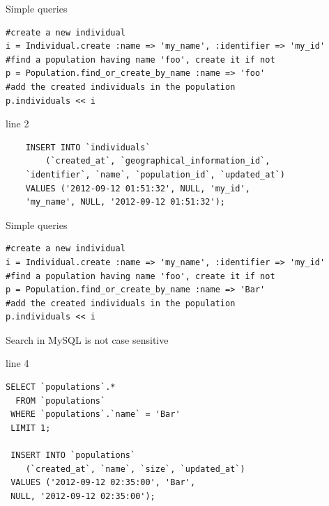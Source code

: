 \documentclass[12pt]{beamer}
\begin{document}

\begin{frame}[fragile]
  \begin{block}{Simple queries}
	\begin{verbatim}
#create a new individual
i = Individual.create :name => 'my_name', :identifier => 'my_id'
#find a population having name 'foo', create it if not
p = Population.find_or_create_by_name :name => 'foo'
#add the created individuals in the population
p.individuals << i
	\end{verbatim}
  \end{block}
  
  \begin{block}{line 2}
  	\begin{verbatim}
  	INSERT INTO `individuals` 
  		(`created_at`, `geographical_information_id`, 
  	`identifier`, `name`, `population_id`, `updated_at`) 
  	VALUES ('2012-09-12 01:51:32', NULL, 'my_id', 
  	'my_name', NULL, '2012-09-12 01:51:32');
  	\end{verbatim}
  \end{block}
\end{frame}

\begin{frame}[fragile]
  \begin{block}{Simple queries}
	\begin{verbatim}
#create a new individual
i = Individual.create :name => 'my_name', :identifier => 'my_id'
#find a population having name 'foo', create it if not
p = Population.find_or_create_by_name :name => 'Bar'
#add the created individuals in the population
p.individuals << i
	\end{verbatim}
	Search in MySQL is not case sensitive
  \end{block}
  
  \begin{block}{line 4}
  	\begin{verbatim}
SELECT `populations`.* 
  FROM `populations` 
 WHERE `populations`.`name` = 'Bar' 
 LIMIT 1;
 
 INSERT INTO `populations` 
 	(`created_at`, `name`, `size`, `updated_at`) 
 VALUES ('2012-09-12 02:35:00', 'Bar', 
 NULL, '2012-09-12 02:35:00');
  	\end{verbatim}
  \end{block}
\end{frame}
\end{document}
